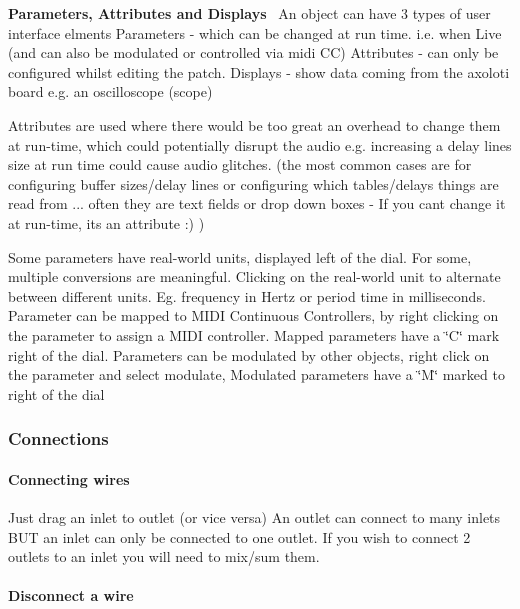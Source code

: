 {\bfseries Parameters, Attributes and Displays}~\newline
 An object can have 3 types of user interface elments Parameters -\/ which can be changed at run time. i.\+e. when Live (and can also be modulated or controlled via midi CC) Attributes -\/ can only be configured whilst editing the patch. Displays -\/ show data coming from the axoloti board e.\+g. an oscilloscope (scope)

Attributes are used where there would be too great an overhead to change them at run-\/time, which could potentially disrupt the audio e.\+g. increasing a delay line\textquotesingle{}s size at run time could cause audio glitches. (the most common cases are for configuring buffer sizes/delay lines or configuring which tables/delays things are read from ... often they are text fields or drop down boxes -\/ If you cant change it at run-\/time, its an attribute \+:) )

Some parameters have real-\/world units, displayed left of the dial. For some, multiple conversions are meaningful. Clicking on the real-\/world unit to alternate between different units. Eg. frequency in Hertz or period time in milliseconds. Parameter can be mapped to M\+I\+DI Continuous Controllers, by right clicking on the parameter to assign a M\+I\+DI controller. Mapped parameters have a \char`\"{}\+C\char`\"{} mark right of the dial. Parameters can be modulated by other objects, right click on the parameter and select modulate, Modulated parameters have a \char`\"{}\+M\char`\"{} marked to right of the dial\hypertarget{axo_gui_axo_gui_axoloti_edit_mode_connections}{}\subsubsection{Connections}\label{axo_gui_axo_gui_axoloti_edit_mode_connections}
\hypertarget{axo_gui_axo_gui_axoloti_edit_mode_connections_connect_wires}{}\paragraph{Connecting wires}\label{axo_gui_axo_gui_axoloti_edit_mode_connections_connect_wires}
Just drag an inlet to outlet (or vice versa) An outlet can connect to many inlets B\+UT an inlet can only be connected to one outlet. If you wish to connect 2 outlets to an inlet you will need to mix/sum them.\hypertarget{axo_gui_axo_gui_axoloti_edit_mode_connections_disconnect_wires}{}\paragraph{Disconnect a wire}\label{axo_gui_axo_gui_axoloti_edit_mode_connections_disconnect_wires}

